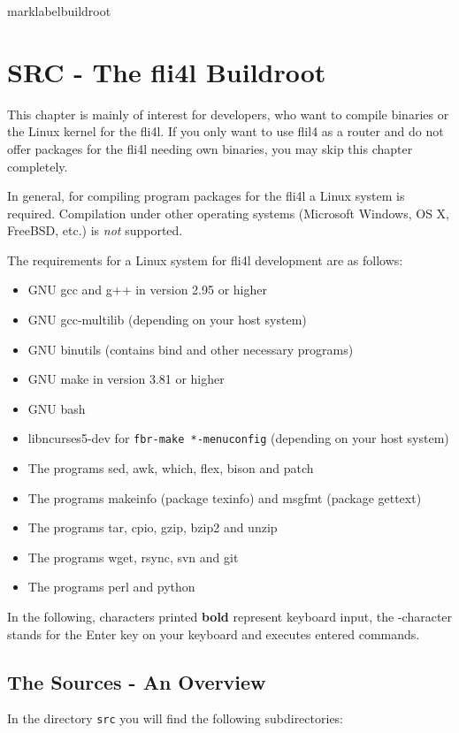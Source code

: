 marklabel{buildroot}{
\section{SRC - The fli4l Buildroot}
}

This chapter is mainly of interest for developers, who want to compile
binaries or the Linux kernel for the fli4l. If you only want to use
flil4 as a router and do not offer packages for the fli4l needing own
binaries, you may skip this chapter completely.

In general, for compiling program packages for the fli4l a
Linux system is required. Compilation under other operating systems
(Microsoft Windows, OS X, FreeBSD, etc.) is \emph{not} supported.

The requirements for a Linux system for fli4l development are as follows:
\begin{itemize}
\item GNU gcc and g++ in version 2.95 or higher
\item GNU gcc-multilib (depending on your host system)
\item GNU binutils (contains bind and other necessary programs)
\item GNU make in version 3.81 or higher
\item GNU bash
\item libncurses5-dev for \texttt{fbr-make *-menuconfig} (depending on your host system)
\item The programs sed, awk, which, flex, bison and patch
\item The programs makeinfo (package texinfo) and msgfmt (package gettext)
\item The programs tar, cpio, gzip, bzip2 and unzip
\item The programs wget, rsync, svn and git
\item The programs perl and python
\end{itemize}

In the following, characters printed \textbf{bold} represent keyboard
input, the \enter-character stands for the Enter key on your keyboard and
executes entered commands.

\subsection{The Sources - An Overview}

In the directory \texttt{src} you will find the following subdirectories:


